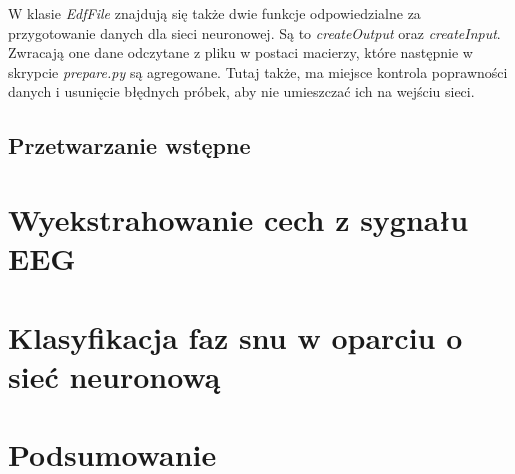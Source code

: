 \documentclass[12pt]{report}
\begin{document}
            W klasie \textit{EdfFile} znajdują się także dwie funkcje odpowiedzialne za przygotowanie danych dla sieci neuronowej. Są to \textit{createOutput} oraz \textit{createInput}. Zwracają one dane odczytane z pliku w postaci macierzy, które następnie w skrypcie \textit{prepare.py} są agregowane. Tutaj także, ma miejsce kontrola poprawności danych i usunięcie błędnych próbek, aby nie umieszczać ich na wejściu sieci.

        \section{Przetwarzanie wstępne}
                        

    \chapter{Wyekstrahowanie cech z sygnału EEG}

    \chapter{Klasyfikacja faz snu w oparciu o sieć neuronową}

    \chapter*{Podsumowanie}

    \cite{dirac}    %
    \printbibliography[heading=bibintoc, title={Bibliografia}]
\end{document}

